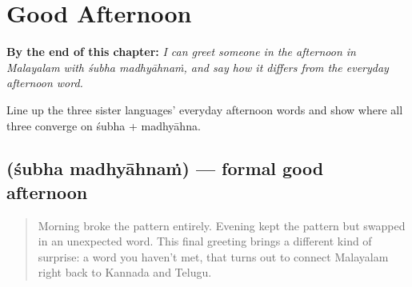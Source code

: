
\chapter{Good Afternoon}
\label{ch:ml-good-afternoon}

\begin{chapteropening}
\textbf{By the end of this chapter:} \emph{I can greet someone in the afternoon in Malayalam with śubha madhyāhnaṁ, and say how it differs from the everyday afternoon word.}

Line up the three sister languages' everyday afternoon words and show where all three converge on śubha + madhyāhna.
\end{chapteropening}

\section[\texorpdfstring{\ml{ശുഭ} \ml{മധ്യാഹ്നം} (śubha madhyāhnaṁ)}{ശുഭ മധ്യാഹ്നം (śubha madhyāhnaṁ)}]{  (śubha madhyāhnaṁ) — formal good afternoon}

\label{lesson:ML-C31-shubha-madhyaahnam}



\begin{quote}
Morning broke the pattern entirely. Evening kept the pattern but swapped in an unexpected word. This final greeting brings a different kind of surprise: a word you haven't met, that turns out to connect Malayalam right back to Kannada and Telugu.
\end{quote}

